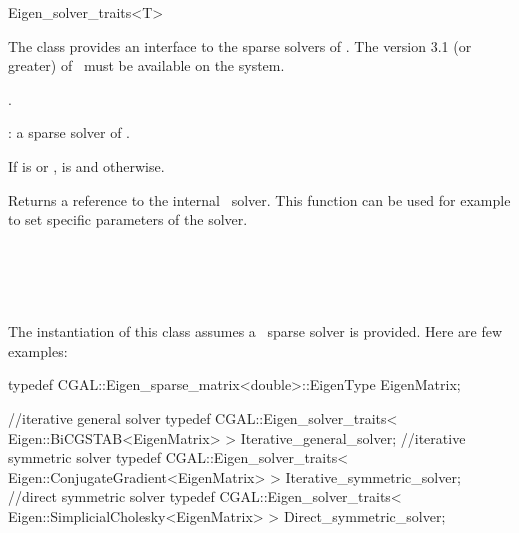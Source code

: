 \ccRefPageBegin
\begin{ccRefClass}{Eigen_solver_traits<T>}


\ccDefinition

The class  provides an interface to the sparse solvers of \eigen. 
The version 3.1 (or greater) of \eigen\ must be available on the system.


\ccIsModel
{}.

\ccParameters
{}: a sparse solver of \eigen.

\ccTypes
{}
{If  is  or ,  is 
and  otherwise.
}

\ccOperations
{}
{
Returns a reference to the internal \eigen\ solver. This function can be used for example to set specific parameters of the solver.
}

\ccSeeAlso
\eigenpage\\
  \\
  \\
  \\

\ccExample
The instantiation of this class assumes a \eigen\ sparse solver is provided. Here are few examples:

\begin{ccExampleCode}
typedef CGAL::Eigen_sparse_matrix<double>::EigenType EigenMatrix;

//iterative general solver
typedef CGAL::Eigen_solver_traits< Eigen::BiCGSTAB<EigenMatrix> > Iterative_general_solver;
//iterative symmetric solver
typedef CGAL::Eigen_solver_traits< Eigen::ConjugateGradient<EigenMatrix> > Iterative_symmetric_solver;
//direct symmetric solver
typedef CGAL::Eigen_solver_traits< Eigen::SimplicialCholesky<EigenMatrix> > Direct_symmetric_solver;
\end{ccExampleCode}


\end{ccRefClass}

\ccRefPageEnd


